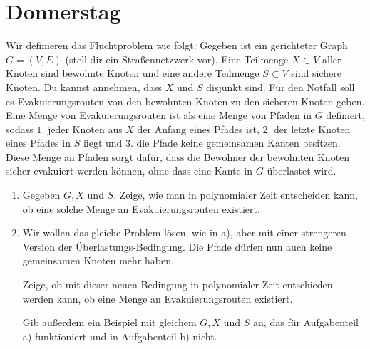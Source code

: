 \documentclass{uebung_cs}
\begin{document}
\section*{Donnerstag}

\begin{aufgabe}[Flucht]
    Wir definieren das Fluchtproblem wie folgt: Gegeben ist ein gerichteter Graph $G = (V,E)$ (stell dir ein Straßennetzwerk vor). Eine Teilmenge $X \subset V$ aller Knoten sind bewohnte Knoten und eine andere Teilmenge $S \subset V$ sind sichere Knoten. Du kannst annehmen, dass $X$ und $S$ disjunkt sind. Für den Notfall soll es Evakuierungsrouten von den bewohnten Knoten zu den sicheren Knoten geben. Eine Menge von Evakuierungsrouten ist als eine Menge von Pfaden in $G$ definiert, sodass $1.$ jeder Knoten aus $X$ der Anfang eines Pfades ist, $2.$ der letzte Knoten eines Pfades in $S$ liegt und $3.$ die Pfade keine gemeinsamen Kanten besitzen. Diese Menge an Pfaden sorgt dafür, dass die Bewohner der bewohnten Knoten sicher evakuiert werden können, ohne dass eine Kante in $G$ überlastet wird.
    \begin{enumerate}
    	\item Gegeben $G, X$ und $S$. Zeige, wie man in polynomialer Zeit entscheiden kann, ob eine solche Menge an Evakuierungsrouten existiert.\\
    	\item Wir wollen das gleiche Problem lösen, wie in a), aber mit einer strengeren Version der Überlastungs-Bedingung. Die Pfade dürfen nun auch keine gemeinsamen Knoten mehr haben.
    	
    	Zeige, ob mit dieser neuen Bedingung in polynomialer Zeit entschieden werden kann, ob eine Menge an Evakuierungsrouten existiert.
    	
    	Gib außerdem ein Beispiel mit gleichem $G, X$ und $S$ an, das für Aufgabenteil a) funktioniert und in Aufgabenteil b) nicht.
    \end{enumerate}
\end{aufgabe}
\end{document}
